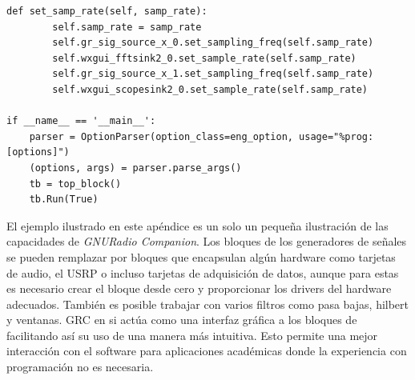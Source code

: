 \begin{lstlisting}[float=hp, label=ex:grcpython, caption={C\'odigo Python generado por GRC}, breaklines=true]
	def set_samp_rate(self, samp_rate):
		self.samp_rate = samp_rate
		self.gr_sig_source_x_0.set_sampling_freq(self.samp_rate)
		self.wxgui_fftsink2_0.set_sample_rate(self.samp_rate)
		self.gr_sig_source_x_1.set_sampling_freq(self.samp_rate)
		self.wxgui_scopesink2_0.set_sample_rate(self.samp_rate)

if __name__ == '__main__':
	parser = OptionParser(option_class=eng_option, usage="%prog: [options]")
	(options, args) = parser.parse_args()
	tb = top_block()
	tb.Run(True)
\end{lstlisting}

El ejemplo ilustrado en este ap\'endice es un solo un peque\~na ilustraci\'on de las capacidades de
\emph{GNURadio Companion}. Los bloques de los generadores de se\~nales se pueden remplazar por
bloques que encapsulan alg\'un hardware como tarjetas de audio, el USRP o incluso tarjetas de
adquisici\'on de datos, aunque para estas es necesario crear el bloque desde cero y proporcionar los
drivers del hardware adecuados. Tambi\'en es posible trabajar con varios filtros como pasa bajas,
hilbert y ventanas. GRC en si act\'ua como una interfaz gr\'afica a los bloques de \gnuradio
facilitando as\'i su uso de una manera m\'as intuitiva. Esto permite una mejor interacci\'on con el
software para aplicaciones acad\'emicas donde la experiencia con programaci\'on no es necesaria.
